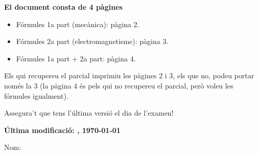 \documentclass[12pt,a4paper]{article}
\begin{document}
\vspace*{\fill}
\begin{center}
     \Huge {\bf El document consta de 4 pàgines}
\end{center}

\quad

{\Large 
    \begin{addmargin}[10em]{0em}
        \begin{itemize}
            \item Fórmules 1a part (mecànica): pàgina 2.
            \item Fórmules 2a part (electromagnetisme): pàgina 3.
            \item Fórmules 1a part + 2a part: pàgina 4.
        \end{itemize}
    \end{addmargin}
    
    \quad
    
    \begin{addmargin}[8em]{8em}
    Els qui recupereu el parcial imprimiu les pàgines 2 i 3, els que no, podeu portar només la 3 (la pàgina 4 és pels qui no recupereu el parcial, però voleu les fórmules igualment).
    
    \quad
    
    Assegura't que tens l'última versió el dia de l'examen!
    
    \quad
    
    \begin{flushright}
        {\bf Última modificació: \currenttime, \today}
    \end{flushright}
    
    \end{addmargin}
}
\vspace*{\fill}

\newpage

\raggedright
\begin{multicols}{4}
{\fontsize{12}{12}\selectfont
}
\newpage
\end{multicols}

\begin{multicols}{3}


\vspace{15pt}
\raggedleft
{\Large Nom: \underline{\hspace{6cm}}}
\end{multicols}


\end{document}
